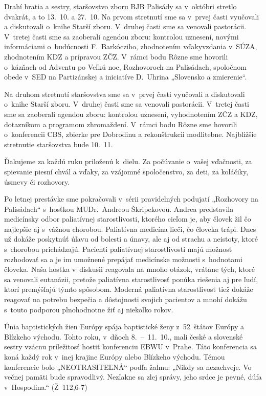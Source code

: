

Drahí bratia a sestry,
staršovstvo zboru BJB Palisády sa v~októbri stretlo dvakrát, a to 13.~10. a 27.~10. Na prvom stretnutí sme sa v~prvej časti vyučovali a diskutovali o~knihe Starší zboru. V~druhej časti sme sa venovali pastorácii. V~tretej časti sme sa zaoberali agendou zboru: kontrolou uznesení, novými informáciami o~budúcnosti F.~Barkócziho, zhodnotením vďakyvzdania v~SÚZA, zhodnotením KDZ a prípravou ZČZ. V~rámci bodu Rôzne sme hovorili o~kázňach od Adventu po Veľkú noc, Rozhovoroch na Palisádach, spoločnom obede v~SED na Partizánskej a iniciatíve D.~Uhrina „Slovensko a zmierenie“.

Na druhom stretnutí staršovstva sme sa v~prvej časti vyučovali a diskutovali o~knihe Starší zboru. V~druhej časti sme sa venovali pastorácii. V~tretej časti sme sa zaoberali agendou zboru: kontrolou uznesení, vyhodnotením ZČZ a KDZ, dotazníkom a programom zhromaždení. V~rámci bodu Rôzne sme hovorili o~konferencii CBS, zbierke pre Dobrodinu a rekonštrukcii modlitebne. Najbližšie stretnutie staršovstva bude 10.~11.


Ďakujeme za každú ruku priloženú k~dielu. Za počúvanie o~vašej vďačnosti, za spievanie piesní chvál a vďaky, za vzájomné spoločenstvo, za deti, za koláčiky, úsmevy či rozhovory.
\vfill\break


Po letnej prestávke sme pokračovali v~sérii pravidelných podujatí „Rozhovory na Palisádach“ s~hosťkou MUDr.~Andreou Škripekovou.
Andrea predstavila medicínsky odbor paliatívnej starostlivosti, ktorého cieľom je, aby človek žil čo najlepšie aj s~vážnou chorobou.
Paliatívna medicína lieči, čo človeka trápi. Dnes už dokáže poskytnúť úľavu od bolesti a únavy, ale aj od strachu a neistoty, ktoré s~chorobou prichádzajú.
Pacienti paliatívnej starostlivosti majú možnosť rozhodovať sa a je im umožnené prepájať medicínske možnosti s~hodnotami človeka.
Naša hosťka v~diskusii reagovala na mnoho otázok, vrátane tých, ktoré sa venovali eutanázii, pretože paliatívna starostlivosť ponúka riešenia aj pre ľudí, ktorí premýšľajú týmto spôsobom.
Moderná paliatívna starostlivosť tiež dokáže reagovať na potrebu bezpečia a dôstojnosti svojich pacientov a mnohí dokážu s~touto podporou plnohodnotne žiť aj niekoľko rokov.


Únia baptistických žien Európy spája baptistické ženy z~52~štátov Európy a Blízkeho východu. Tohto roku, v~dňoch 8.~--~11.~10., mali české a slovenské sestry vzácnu príležitosť hostiť konferenciu EBWU v~Prahe. Táto konferencia sa koná každý rok v~inej krajine Európy alebo Blízkeho východu.
Témou konferencie bolo „NEOTRASITEĽNÁ“ podľa žalmu: „Nikdy sa nezachveje. Vo večnej pamäti bude spravodlivý. Nezľakne sa zlej správy, jeho srdce je pevné, dúfa v~Hospodina.“ (Ž~112,6-7)

